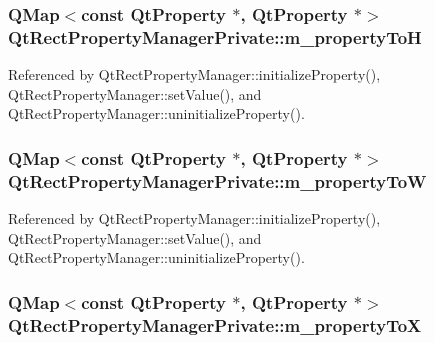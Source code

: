 \subsubsection[{m\+\_\+property\+ToH}]{\setlength{\rightskip}{0pt plus 5cm}Q\+Map$<$const {\bf Qt\+Property} $\ast$, {\bf Qt\+Property} $\ast$$>$ Qt\+Rect\+Property\+Manager\+Private\+::m\+\_\+property\+ToH}\label{classQtRectPropertyManagerPrivate_a0428e4c4f216ef69d349c5c14f1dd665}


Referenced by Qt\+Rect\+Property\+Manager\+::initialize\+Property(), Qt\+Rect\+Property\+Manager\+::set\+Value(), and Qt\+Rect\+Property\+Manager\+::uninitialize\+Property().

\subsubsection[{m\+\_\+property\+ToW}]{\setlength{\rightskip}{0pt plus 5cm}Q\+Map$<$const {\bf Qt\+Property} $\ast$, {\bf Qt\+Property} $\ast$$>$ Qt\+Rect\+Property\+Manager\+Private\+::m\+\_\+property\+ToW}\label{classQtRectPropertyManagerPrivate_a1cb44e32c0cf1055681517b93a6f29cf}


Referenced by Qt\+Rect\+Property\+Manager\+::initialize\+Property(), Qt\+Rect\+Property\+Manager\+::set\+Value(), and Qt\+Rect\+Property\+Manager\+::uninitialize\+Property().

\subsubsection[{m\+\_\+property\+ToX}]{\setlength{\rightskip}{0pt plus 5cm}Q\+Map$<$const {\bf Qt\+Property} $\ast$, {\bf Qt\+Property} $\ast$$>$ Qt\+Rect\+Property\+Manager\+Private\+::m\+\_\+property\+ToX}\label{classQtRectPropertyManagerPrivate_a249a5c20c4f461e827ce8279a1455336}


